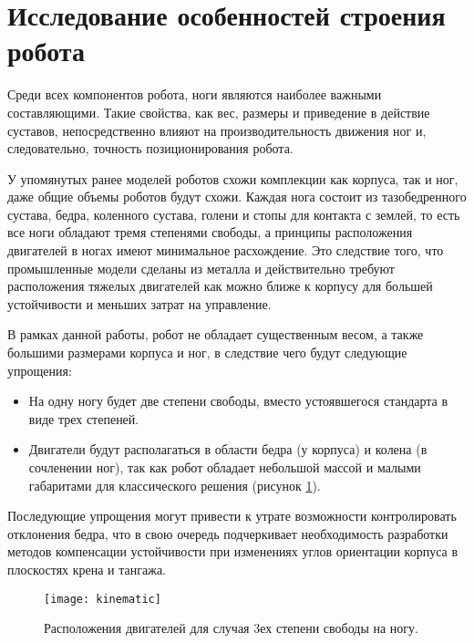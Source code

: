 \section{Исследование особенностей строения робота}\label{C1_2}
Среди всех компонентов робота, ноги являются наиболее важными составляющими. Такие свойства, как вес, размеры и приведение в действие суставов, непосредственно влияют на производительность движения ног и, следовательно, точность позиционирования робота.

У упомянутых ранее моделей роботов схожи комплекции как корпуса, так и ног, даже общие объемы роботов будут схожи. 
Каждая нога состоит из тазобедренного сустава, бедра, коленного сустава, голени и стопы для контакта с землей, то есть все ноги обладают тремя степенями свободы, а принципы расположения двигателей в ногах имеют минимальное расхождение. Это следствие того, что промышленные модели сделаны из металла и действительно требуют расположения тяжелых двигателей как можно ближе к корпусу для большей устойчивости и меньших затрат на управление. 

В рамках данной работы, робот не обладает существенным весом, а также большими размерами корпуса и ног, в следствие чего будут следующие упрощения:
\begin{itemize}
	\item На одну ногу будет две степени свободы, вместо устоявшегося стандарта в виде трех степеней.
	\item Двигатели будут располагаться в области бедра (у корпуса) и колена (в сочленении ног), так как робот обладает небольшой массой и малыми габаритами для классического решения (рисунок \ref{kinematic}).
\end{itemize}


Последующие упрощения могут привести к утрате возможности контролировать отклонения бедра, что в свою очередь подчеркивает необходимость разработки методов компенсации устойчивости при изменениях углов ориентации корпуса в плоскостях крена и тангажа.
\begin{figure}[h]
	\begin{center}
		\texttt{[image: kinematic]}
		\caption{Расположения двигателей для случая 3ех степени свободы на ногу.}
		\label{kinematic}
	\end{center}
\end{figure}


\newpage
